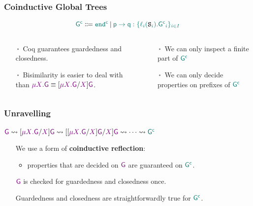 \begin{frame}[fragile]
  \frametitle{Coinductive Global Trees}
  \[
    \coG \Coloneqq \cogend \SEP
    \comsgni \p\q \ell {\tS} {\coG}
  \]
  \vfill
  \begin{columns}
    \begin{column}[t]{.49\textwidth}
      \begin{greenbox}{}
        \small
        \begin{itemize}%
        \item[$\itm$] Coq guarantees guardedness and closedness.
        \item[$\itm$] Bisimilarity is easier to deal with than
          $\grec{\gX}{\G} \equiv [\grec{\gX}{\G}/\gX]\G$.
        \end{itemize}
      \end{greenbox}
    \end{column}
    \begin{column}[t]{.49\textwidth}
      \begin{redbox}
        \small
        \begin{itemize}%
        \item[$\itm$] We can only inspect a finite part of $\coG$
        \item[$\itm$] We can only decide properties on prefixes of $\coG$
        \end{itemize}
      \end{redbox}
    \end{column}
  \end{columns}
\end{frame}

\begin{frame}[fragile]
  \frametitle{Unravelling}
  $\G \leadsto [\grec{\gX}{\G}/\gX]\G \leadsto [[\grec{\gX}{\G}/\gX]\G/\gX]\G
  \leadsto \cdots \leadsto \coG$

  \vspace{1cm}
  \begin{itemize}
  \item[\itm] We use a form of {\color{blue}\textbf{coinductive reflection}}:
    \begin{itemize}
      \item properties that are
        decided on $\G$ are guaranteed on $\coG$.
      \end{itemize}
  \item[\itm] $\G$ is checked for guardedness and closedness once.
  \item[\itm] Guardedness and closedness are straightforwardly true for $\coG$.
  \end{itemize}
\end{frame}

